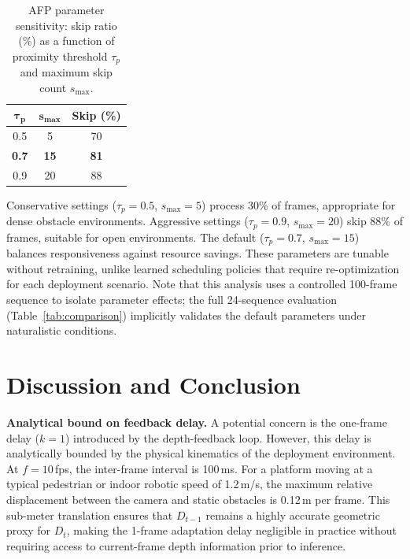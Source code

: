 \documentclass[conference]{IEEEtran}
\begin{document}
\begin{table}[t]
  \centering
  \caption{AFP parameter sensitivity: skip ratio (\%) as a function of
    proximity threshold $\tau_p$ and maximum skip count $s_\text{max}$.}
  \label{tab:sensitivity}
  \begin{tabular}{@{}ccc@{}}
    \toprule
    $\boldsymbol{\tau_p}$ & $\boldsymbol{s_\text{max}}$
      & \textbf{Skip (\%)} \\
    \midrule
    0.5 &  5 & 70 \\
    \textbf{0.7} & \textbf{15} & \textbf{81} \\
    0.9 & 20 & 88 \\
    \bottomrule
  \end{tabular}
\end{table}

Conservative settings ($\tau_p = 0.5$, $s_\text{max} = 5$) process
30\% of frames, appropriate for dense obstacle environments.
Aggressive settings ($\tau_p = 0.9$, $s_\text{max} = 20$) skip 88\%
of frames, suitable for open environments. The default ($\tau_p = 0.7$,
$s_\text{max} = 15$) balances responsiveness against resource savings.
These parameters are tunable without retraining, unlike learned
scheduling policies that require re-optimization for each deployment
scenario. Note that this analysis uses a controlled 100-frame sequence
to isolate parameter effects; the full 24-sequence evaluation
(Table~\ref{tab:comparison}) implicitly validates the default
parameters under naturalistic conditions.


\section{Discussion and Conclusion}
\label{sec:conclusion}

\textbf{Analytical bound on feedback delay.} A potential concern
is the one-frame delay ($k{=}1$) introduced by the depth-feedback
loop. However, this delay is analytically bounded by the physical
kinematics of the deployment environment. At $f{=}10$\,fps, the
inter-frame interval is 100\,ms. For a platform moving at a typical
pedestrian or indoor robotic speed of 1.2\,m/s, the maximum relative
displacement between the camera and static obstacles is 0.12\,m per
frame. This sub-meter translation ensures that $D_{t-1}$ remains a
highly accurate geometric proxy for $D_t$, making the 1-frame
adaptation delay negligible in practice without requiring access
to current-frame depth information prior to inference.
\end{document}
